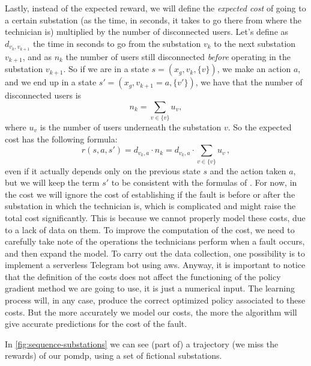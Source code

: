 Lastly, instead of the expected reward, we will define the \emph{expected cost} of going to a certain substation (as the time, in seconds, it takes to go there from where the technician is) multiplied by the number of disconnected users. Let's define as $d_{v_k, v_{k+1}}$ the time in seconds to go from the substation $v_k$ to the next substation $v_{k+1}$, and as $n_{k}$ the number of users still disconnected \emph{before} operating in the substation $v_{k+1}$. So if we are in a state $s = (x_g, v_k, \{v\})$, we make an action $a$, and we end up in a state $s' = (x_g, v_{k+1} = a, \{v'\})$, we have that the number of disconnected users is
\begin{equation}
    n_{k} = \sum_{v \in \{v\}} u_v,
\end{equation}
where $u_v$ is the number of users underneath the substation $v$. So the expected cost has the following formula:
\begin{equation}
    r(s, a, s') = d_{v_k, a} \cdot n_{k} = d_{v_k, a} \cdot \sum_{v \in \{v\}} u_v \, ,
    \label{eq:expected-cost}
\end{equation}
even if it actually depends only on the previous state $s$ and the action taken $a$, but we will keep the term $s'$ to be consistent with the formulas of \cite{SuttonBarto}.
For now, in the cost we will ignore the cost of establishing if the fault is before or after the substation in which the technician is, which is complicated and might raise the total cost significantly. This is because we cannot properly model these costs, due to a lack of data on them. To improve the computation of the cost, we need to carefully take note of the operations the technicians perform when a fault occurs, and then expand the model. To carry out the data collection, one possibility is to implement a serverless Telegram bot using \acrshort{aws}. 
Anyway, it is important to notice that the definition of the costs does not affect the functioning of the policy gradient method we are going to use, it is just a numerical input. The learning process will, in any case, produce the correct optimized policy associated to these costs. But the more accurately we model our costs, the more the algorithm will give accurate predictions for the cost of the fault.

In \autoref{fig:sequence-substations} we can see (part of) a trajectory (we miss the rewards) of our \acrshort{pomdp}, using a set of fictional substations.

